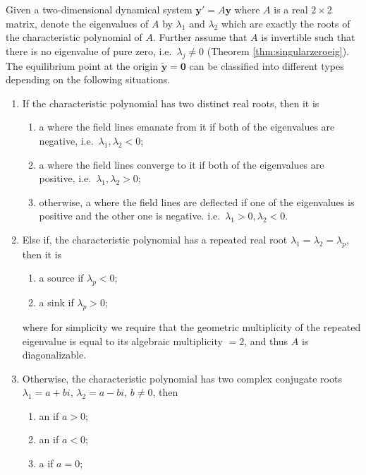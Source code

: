 \begin{proper}
\label{proper:2dequiltypes}
Given a two-dimensional dynamical system $\textbf{y}' = A\textbf{y}$ where $A$ is a real $2 \times 2$ matrix, denote the eigenvalues of $A$ by $\lambda_1$ and $\lambda_2$ which are exactly the roots of the characteristic polynomial of $A$. Further assume that $A$ is invertible such that there is no eigenvalue of pure zero, i.e.\ $\lambda_j \neq 0$ (Theorem \ref{thm:singularzeroeig}). The equilibrium point at the origin $\tilde{\textbf{y}} = \textbf{0}$ can be classified into different types depending on the following situations.
\begin{enumerate}
    \item If the characteristic polynomial has two distinct real roots, then it is
    \begin{enumerate}[label=(\alph*)]
        \item a  where the field lines emanate from it if both of the eigenvalues are negative, i.e.\ $\lambda_1, \lambda_2 < 0$;
        \item a  where the field lines converge to it if both of the eigenvalues are positive, i.e.\ $\lambda_1, \lambda_2 > 0$; 
        \item otherwise, a  where the field lines are deflected if one of the eigenvalues is positive and the other one is negative. i.e.\ $\lambda_1 > 0, \lambda_2 < 0$.
    \end{enumerate}
    \item Else if, the characteristic polynomial has a repeated real root $\lambda_1 = \lambda_2 = \lambda_p$, then it is
    \begin{enumerate}[label=(\alph*)]
        \item a source if $\lambda_p < 0$;
        \item a sink if $\lambda_p > 0$; 
    \end{enumerate}
    where for simplicity we require that the geometric multiplicity of the repeated eigenvalue is equal to its algebraic multiplicity $= 2$, and thus $A$ is diagonalizable.
    \item Otherwise, the characteristic polynomial has two complex conjugate roots $\lambda_1 = a+bi$, $\lambda_2 = a-bi$, $b \neq 0$, then
    \begin{enumerate}[label=(\alph*)]
        \item an  if $a > 0$;
        \item an  if $a < 0$;
        \item a  if $a = 0$;
    \end{enumerate}
\end{enumerate}
\end{proper}
